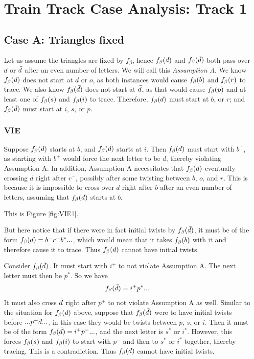 \chapter[Train Track Case Analysis: Track 1]{Train Track Case Analysis: Track 1}
\label{app:case_analysis_track1}

\section{Case A: Triangles fixed} \label{CaseATrack1}

Let us assume the triangles are fixed by $f_\beta$, hence $f_\beta(d)$ and $f_\beta(\bar{d})$ both pass over $d$ or $\bar{d}$ after an even
number of letters. We will call this \emph{Assumption A}. We know $f_\beta(d)$ does not start at $d$ or $o$, as both instances would cause $f_\beta(b)$ and $f_\beta(r)$ to trace. We also know $f_\beta(\bar{d})$ does not start at $\bar{d}$, as that would cause $f_\beta(p)$ and at least one of $f_\beta(s)$ and $f_\beta(i)$ to trace. Therefore, $f_\beta(d)$ must start at $b$, or $r$; and $f_\beta(\bar{d})$ must start at $i$, $s$, or $p$.


\subsection{VIE} \label{VIE}
Suppose $f_\beta(d)$ starts at $b$, and $f_\beta(\bar{d})$ starts at $i$. Then $f_\beta(d)$ must start with $b^-$, as starting with $b^+$ would force the next letter to be $d$, thereby violating Assumption A. In addition, Assumption A necessitates that $f_\beta(d)$ eventually crossing $d$ right after $r^-$, possibly after some twisting between $b$, $o$, and $r$. This is because it is impossible to cross over $d$ right after $b$ after an even number of letters, assuming that $f_\beta(d)$ starts at $b$. 

This is Figure \ref{fig:VIE1}.

But here notice that if there were in fact initial twists by $f_\beta(\bar{d})$, it must be of the form $f_\beta(d) = b^- r^+ b^*...$, which would mean that it takes $f_\beta(b)$ with it and therefore cause it to trace. Thus $f_\beta(d)$ cannot have initial twists.

Consider $f_\beta(\bar{d})$. It must start with $i^+$ to not violate Assumption A. The next letter must then be $p^*$. So we have
\[
f_\beta(\bar{d}) = i^+ p^*...
\]
It must also cross $\bar{d}$ right after $p^+$ to not violate Assumption A as well. Similar to the situation for $f_\beta(d)$ above, suppose that $f_\beta(\bar{d})$ were to have initial twists before $...p^+\bar{d}...$, in this case they would be twists between $p$, $s$, or $i$. Then it must be of the form $f_\beta(\bar{d}) = i^+ p^-...$, and the next letter is $s^*$ or $i^*$. However, this forces $f_\beta(s)$ and $f_\beta(i)$ to start with $p^-$ and then to $s^*$ or $i^*$ together, thereby tracing. This is a contradiction. Thus $f_\beta(\bar{d})$ cannot have initial twists. 

